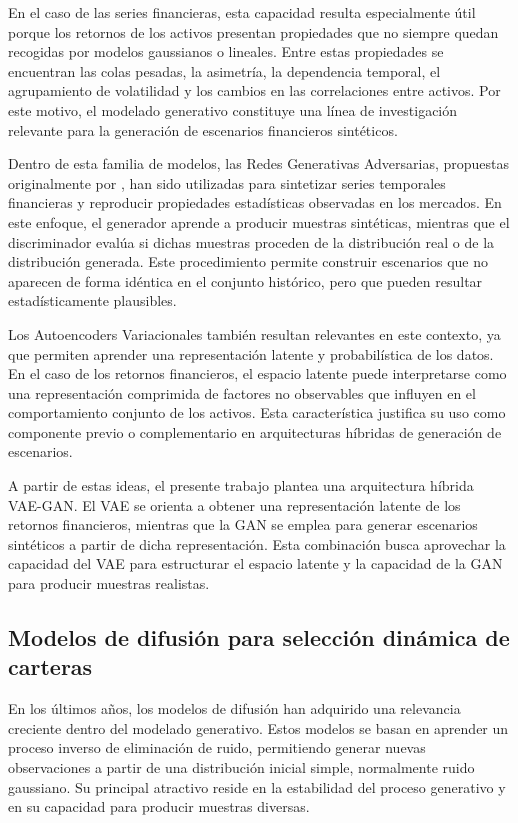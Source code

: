 En el caso de las series financieras, esta capacidad resulta especialmente útil porque los retornos de los activos presentan propiedades que no siempre quedan recogidas por modelos gaussianos o lineales. Entre estas propiedades se encuentran las colas pesadas, la asimetría, la dependencia temporal, el agrupamiento de volatilidad y los cambios en las correlaciones entre activos. Por este motivo, el modelado generativo constituye una línea de investigación relevante para la generación de escenarios financieros sintéticos.

Dentro de esta familia de modelos, las Redes Generativas Adversarias, propuestas originalmente por \cite{goodfellow2014generative}, han sido utilizadas para sintetizar series temporales financieras y reproducir propiedades estadísticas observadas en los mercados. En este enfoque, el generador aprende a producir muestras sintéticas, mientras que el discriminador evalúa si dichas muestras proceden de la distribución real o de la distribución generada. Este procedimiento permite construir escenarios que no aparecen de forma idéntica en el conjunto histórico, pero que pueden resultar estadísticamente plausibles.

Los Autoencoders Variacionales también resultan relevantes en este contexto, ya que permiten aprender una representación latente y probabilística de los datos. En el caso de los retornos financieros, el espacio latente puede interpretarse como una representación comprimida de factores no observables que influyen en el comportamiento conjunto de los activos. Esta característica justifica su uso como componente previo o complementario en arquitecturas híbridas de generación de escenarios.

A partir de estas ideas, el presente trabajo plantea una arquitectura híbrida VAE-GAN. El VAE se orienta a obtener una representación latente de los retornos financieros, mientras que la GAN se emplea para generar escenarios sintéticos a partir de dicha representación. Esta combinación busca aprovechar la capacidad del VAE para estructurar el espacio latente y la capacidad de la GAN para producir muestras realistas.

\subsection{Modelos de difusión para selección dinámica de carteras}

En los últimos años, los modelos de difusión han adquirido una relevancia creciente dentro del modelado generativo. Estos modelos se basan en aprender un proceso inverso de eliminación de ruido, permitiendo generar nuevas observaciones a partir de una distribución inicial simple, normalmente ruido gaussiano. Su principal atractivo reside en la estabilidad del proceso generativo y en su capacidad para producir muestras diversas.

